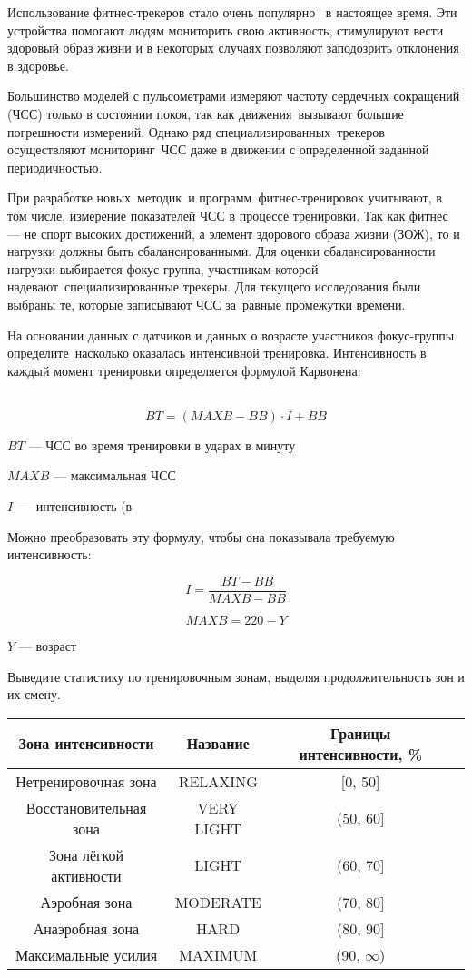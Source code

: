 
Использование фитнес-трекеров стало очень популярно  в настоящее время. Эти устройства помогают людям мониторить свою активность, стимулируют вести здоровый образ жизни и в некоторых случаях позволяют заподозрить отклонения в здоровье. 

Большинство моделей с пульсометрами измеряют частоту сердечных сокращений (ЧСС) только в состоянии покоя, так как движения вызывают большие погрешности измерений. Однако ряд специализированных трекеров осуществляют мониторинг ЧСС даже в движении с определенной заданной периодичностью.

При разработке новых методик и программ фитнес-тренировок учитывают, в том числе, измерение показателей ЧСС в процессе тренировки. Так как фитнес — не спорт высоких достижений, а элемент здорового образа жизни (ЗОЖ), то и нагрузки должны быть сбалансированными. Для оценки сбалансированности нагрузки выбирается фокус-группа, участникам которой надевают специализированные трекеры. Для текущего исследования были выбраны те, которые записывают ЧСС за равные промежутки времени.

На основании данных с датчиков и данных о возрасте участников фокус-группы определите насколько оказалась интенсивной тренировка. Интенсивность в каждый момент тренировки определяется формулой Карвонена:

 $$BT = (MAXB - BB) \cdot I + BB$$

$BT$ — ЧСС во время тренировки в ударах в минуту

$MAXB$ — максимальная ЧСС

$I$ — интенсивность (в %

Можно преобразовать эту формулу, чтобы она показывала требуемую интенсивность:

$$I = \dfrac{BT-BB}{MAXB-BB}$$

$$MAXB = 220 - Y$$

$Y$ — возраст

Выведите статистику по тренировочным зонам, выделяя продолжительность зон и их смену.


\begin{tabular}{|c|c|c|c|}
    \hline
Зона интенсивности&Название&Границы интенсивности, \% \\
\hline
Нетренировочная зона&RELAXING&[0, 50]\\
Восстановительная зона&VERY LIGHT&(50, 60]\\
Зона лёгкой активности&LIGHT&(60, 70]\\
Аэробная зона&MODERATE&(70, 80]\\
Анаэробная зона&HARD&(80, 90]\\
Максимальные усилия&MAXIMUM&(90, $\infty$)\\
\hline
\end{tabular}


